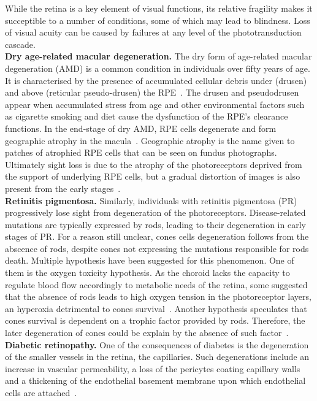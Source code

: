 \documentclass[12pt,a4paper]{journal}
\begin{document}
While the retina is a key element of visual functions, its relative fragility makes it succeptible to a number of conditions, some of which may lead to blindness.
Loss of visual acuity can be caused by failures at any level of the phototransduction cascade.\\
\textbf{Dry age-related macular degeneration.}
The dry form of age-related macular degeneration (AMD) is a common condition in individuals over fifty years of age.
It is characterised by the presence of accumulated cellular debris under (drusen) and above (reticular pseudo-drusen) the RPE~\cite{Bottos_2012}.
The drusen and pseudodrusen appear when accumulated stress from age and other environmental factors such as cigarette smoking and diet cause the dysfunction of the RPE's clearance functions.
In the end-stage of dry AMD, RPE cells degenerate and form geographic atrophy in the macula~\cite{Jager_2008}.
Geographic atrophy is the name given to patches of atrophied RPE cells that can be seen on fundus photographs.
Ultimately sight loss is due to the atrophy of the photoreceptors deprived from the support of underlying RPE cells, but a gradual distortion of images is also present from the early stages~\cite{Newsom_2008,Zacks_2022}.\\
\textbf{Retinitis pigmentosa.}
Similarly, individuals with retinitis pigmentosa (PR) progressively lose sight from degeneration of the photoreceptors.
Disease-related mutations are typically expressed by rods, leading to their degeneration in early stages of PR.
For a reason still unclear, cones cells degeneration follows from the abscence of rods, despite cones not expressing the mutations responsible for rods death.
Multiple hypothesis have been suggested for this phenomenon.
One of them is the oxygen toxicity hypothesis.
As the choroid lacks the capacity to regulate blood flow accordingly to metabolic needs of the retina, some suggested that the absence of rods leads to high oxygen tension in the photoreceptor layers, an hyperoxia detrimental to cones survival~\cite{Roberts_2018,Stone_1999}.
Another hypothesis speculates that cones survival is dependent on a trophic factor provided by rods.
Therefore, the later degeneration of cones could be explain by the absence of such factor~\cite{Roberts_2022}.\\
\textbf{Diabetic retinopathy.}
One of the consequences of diabetes is the degeneration of the smaller vessels in the retina, the capillaries.
Such degenerations include an increase in vascular permeability, a loss of the pericytes coating capillary walls and a thickening of the endothelial basement membrane upon which endothelial cells are attached~\cite{Medina_2016}.
\end{document}
